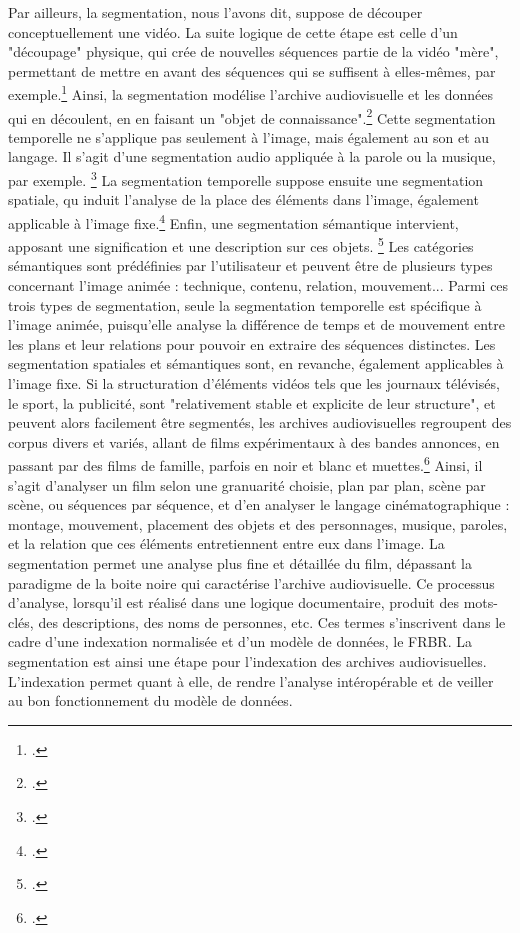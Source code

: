 Par ailleurs, la segmentation, nous l'avons dit, suppose de découper conceptuellement une vidéo. La suite logique de cette étape est celle d'un "découpage" physique, qui crée de nouvelles séquences  partie de la vidéo "mère", permettant de mettre en avant des séquences qui se suffisent à elles-mêmes, par exemple.\footcite{stockinger2011}
Ainsi, la segmentation modélise l'archive audiovisuelle et les données qui en découlent, en en faisant un "objet de connaissance".\footcite{stockinger2011} Cette segmentation temporelle ne s'applique pas seulement à l'image, mais également au son et au langage. Il s'agit d'une segmentation audio appliquée à la parole ou la musique, par exemple. \footcite{carrive2014} La segmentation temporelle suppose ensuite une segmentation spatiale, qu induit l'analyse de la place des éléments dans l'image, également applicable à l'image fixe.\footcite{zhou2022} Enfin, une segmentation sémantique intervient, apposant une signification et une description sur ces objets. \footcite{zhou2022} Les catégories sémantiques sont prédéfinies par l'utilisateur et peuvent être de plusieurs types concernant l'image animée : technique, contenu, relation, mouvement...
Parmi ces trois types de segmentation, seule la segmentation temporelle est spécifique à l'image animée, puisqu'elle analyse la différence de temps et de mouvement entre les plans et leur relations pour pouvoir en extraire des séquences distinctes. Les segmentation spatiales et sémantiques sont, en revanche, également applicables à l'image fixe. 
Si la structuration d'éléments vidéos tels que les journaux télévisés, le sport, la publicité, sont "relativement stable et explicite de leur structure", et peuvent alors facilement être segmentés, les archives audiovisuelles regroupent des corpus divers et variés, allant de films expérimentaux à des bandes annonces, en passant par des films de famille, parfois en noir et blanc et muettes.\footcite{carrive2014} 
Ainsi, il s'agit d'analyser un film selon une granuarité choisie, plan par plan, scène par scène, ou séquences par séquence, et d'en analyser le langage cinématographique : montage, mouvement, placement des objets et des personnages, musique, paroles, et la relation que ces éléments entretiennent entre eux dans l'image.
La segmentation permet une analyse plus fine et détaillée du film, dépassant la paradigme de la boite noire qui caractérise l'archive audiovisuelle. 
Ce processus d'analyse, lorsqu'il est réalisé dans une logique documentaire, produit des mots-clés, des descriptions, des noms de personnes, etc. Ces termes s'inscrivent dans le cadre d'une indexation normalisée et d'un modèle de données, le FRBR. La segmentation est ainsi une étape pour l'indexation des archives audiovisuelles. L'indexation permet quant à elle, de rendre l'analyse intéropérable et de veiller au bon fonctionnement du modèle de données. 

